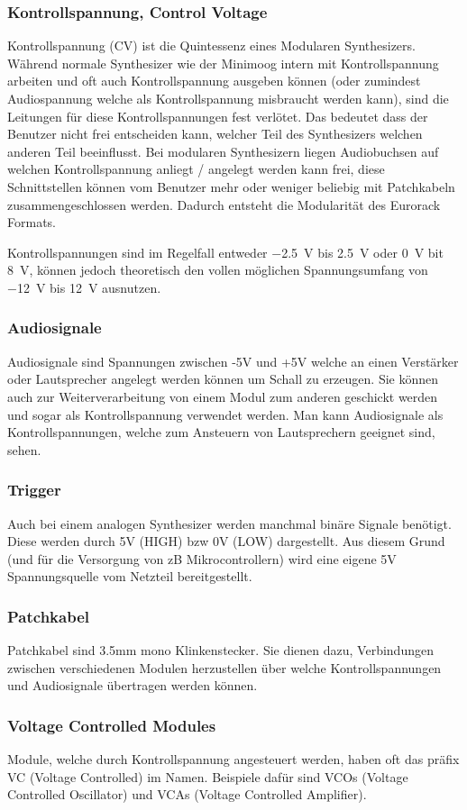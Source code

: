 \subsubsection{Kontrollspannung, Control Voltage}
\label{sec:org5460bca}
Kontrollspannung (CV) ist die Quintessenz eines Modularen Synthesizers. Während normale Synthesizer wie der Minimoog intern mit Kontrollspannung arbeiten und oft auch Kontrollspannung ausgeben können (oder zumindest Audiospannung welche als Kontrollspannung misbraucht werden kann), sind die Leitungen für diese Kontrollspannungen fest verlötet. Das bedeutet dass der Benutzer nicht frei entscheiden kann, welcher Teil des Synthesizers welchen anderen Teil beeinflusst. Bei modularen Synthesizern liegen Audiobuchsen auf welchen Kontrollspannung anliegt / angelegt werden kann frei, diese Schnittstellen können vom Benutzer mehr oder weniger beliebig mit Patchkabeln zusammengeschlossen werden. Dadurch entsteht die Modularität des Eurorack Formats.

Kontrollspannungen sind im Regelfall entweder \SI{-2.5}{\volt} bis \SI{+2.5}{\volt} oder \SI{0}{\volt} bit \SI{8}{\volt}, können jedoch theoretisch den vollen möglichen Spannungsumfang von \SI{-12}{\volt} bis \SI{+12}{\volt} ausnutzen.

\subsubsection{Audiosignale}
\label{sec:org4652f65}
Audiosignale sind Spannungen zwischen -5V und +5V welche an einen Verstärker oder Lautsprecher angelegt werden können um Schall zu erzeugen. Sie können auch zur Weiterverarbeitung von einem Modul zum anderen geschickt werden und sogar als Kontrollspannung verwendet werden. Man kann Audiosignale als Kontrollspannungen, welche zum Ansteuern von Lautsprechern geeignet sind, sehen.

\subsubsection{Trigger}
\label{sec:org54091d8}
Auch bei einem analogen Synthesizer werden manchmal binäre Signale benötigt. Diese werden durch 5V (HIGH) bzw 0V (LOW) dargestellt. Aus diesem Grund (und für die Versorgung von zB Mikrocontrollern) wird eine eigene 5V Spannungsquelle vom Netzteil bereitgestellt.

\subsubsection{Patchkabel}
\label{sec:org74acb1e}
Patchkabel sind 3.5mm mono Klinkenstecker. Sie dienen dazu, Verbindungen zwischen verschiedenen Modulen herzustellen über welche Kontrollspannungen und Audiosignale übertragen werden können.

\subsubsection{Voltage Controlled Modules}
\label{sec:org74a028a}
Module, welche durch Kontrollspannung angesteuert werden, haben oft das präfix VC (Voltage Controlled) im Namen. Beispiele dafür sind VCOs (Voltage Controlled Oscillator) und VCAs (Voltage Controlled Amplifier).
